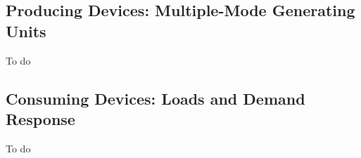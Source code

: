 \subsection{Producing Devices: Multiple-Mode Generating Units}
\label{sec:multi-generator}
\begin{todo}[]{}
To do
\end{todo}
\subsection{Consuming Devices: Loads and Demand Response}
\label{sec:load}
\begin{todo}[]{}
To do
\end{todo}

